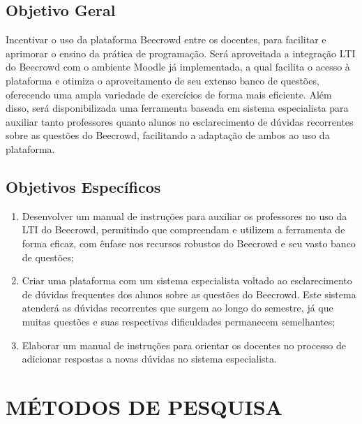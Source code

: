 \subsection{\textbf{Objetivo Geral}}

Incentivar o uso da plataforma Beecrowd entre os docentes, para facilitar e aprimorar o ensino da prática de programação. Será aproveitada a integração LTI do Beecrowd com o ambiente Moodle já implementada, a qual facilita o acesso à plataforma e otimiza o aproveitamento de seu extenso banco de questões, oferecendo uma ampla variedade de exercícios de forma mais eficiente. Além disso, será disponibilizada uma ferramenta baseada em sistema especialista para auxiliar tanto professores quanto alunos no esclarecimento de dúvidas recorrentes sobre as questões do Beecrowd, facilitando a adaptação de ambos ao uso da plataforma.

\subsection{\textbf{Objetivos Específicos}}

\begin{enumerate}[label=(\alph*)]
    \item  Desenvolver um manual de instruções para auxiliar os professores no uso da LTI do Beecrowd, permitindo que compreendam e utilizem a ferramenta de forma eficaz, com ênfase nos recursos robustos do Beecrowd e seu vasto banco de questões;
    \item  Criar uma plataforma com um sistema especialista voltado ao esclarecimento de dúvidas frequentes dos alunos sobre as questões do Beecrowd. Este sistema atenderá as dúvidas recorrentes que surgem ao longo do semestre, já que muitas questões e suas respectivas dificuldades permanecem semelhantes;
    \item  Elaborar um manual de instruções para orientar os docentes no processo de adicionar respostas a novas dúvidas no sistema especialista.
\end{enumerate}

\section{MÉTODOS DE PESQUISA}

